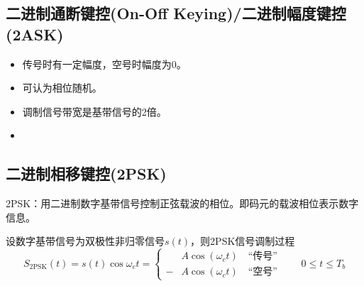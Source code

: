        \subsection{二进制通断键控(On-Off Keying)/二进制幅度键控(2ASK)}
            \begin{itemize}
                \item 传号时有一定幅度，空号时幅度为0。
                \item 可认为相位随机。
                \item 调制信号带宽是基带信号的2倍。
                \item 
            \end{itemize}
        
        \subsection{二进制相移键控(2PSK)}
            2PSK：用二进制数字基带信号控制正弦载波的相位。即码元的载波相位表示数字信息。

            设数字基带信号为双极性非归零信号$s(t)$，则2PSK信号调制过程
            \begin{equation}
                S_\mathrm{2PSK}(t)=s(t)\cos\omega_ct=
                \left\{\begin{aligned}
                    &A\cos(\omega_ct)\quad\mbox{“传号”}\\
                    -&A\cos(\omega_ct)\quad\mbox{“空号”}
                \end{aligned}\right.
                \qquad 0\leqslant t\leqslant T_b
            \end{equation}
            
